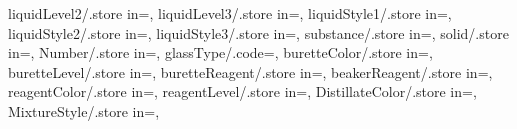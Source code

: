{  liquidLevel2/.store in=\tkzLiquidLevelII,
  liquidLevel3/.store in=\tkzLiquidLevelIII,
  liquidStyle1/.store in=\tkzLiquidStyleI,
  liquidStyle2/.store in=\tkzLiquidStyleII,
  liquidStyle3/.store in=\tkzLiquidStyleIII,
  substance/.store in=\tkzSubstance,
  solid/.store in=\tkzSolid,
  Number/.store in=\tkzNumber,
  glassType/.code={\edef\tkzGlassType{\tkzGlassTypeLookup{#1}}\def\tkzGlassTypeName{#1}},
  buretteColor/.store in=\tkzBuretteColor,
  buretteLevel/.store in=\tkzBuretteLevel,
  buretteReagent/.store in=\tkzBuretteReagent,
  beakerReagent/.store in=\tkzBeakerReagent,
  reagentColor/.store in=\tkzReagentColor,
  reagentLevel/.store in=\tkzReagentLevel,
  DistillateColor/.store in=\tkzDistillateColor,
  MixtureStyle/.store in=\tkzMixtureStyle,
}

\newcommand{\tikzchemlabdefaults}{%
  \TkzBurettetrue
  \TkzTitrationPHMeterfalse
  \TkzTestTubeStopperfalse
  \TkzTestTubeStraightTubefalse
  \TkzTestTubeElbowTubefalse
  \TkzTestTubeUTubefalse
  \TkzTestTubeUTubeLongfalse
  \TkzTestTubeCurvedTubefalse
  \TkzTestTubeCurvedTubeShortfalse
  \TkzTestTubeDoubleTubefalse
  \TkzTestTubeCondenserBulbsfalse
  \TkzTestTubeClampfalse
  \TkzBubblingfalse
  \TkzGasCollectionfalse
  \TkzTubeOnlyfalse
  \TkzGasTubeStraightfalse
  \TkzBunsenBurnertrue
  \TkzLabelfalse
  \TkzMagneticStirrertrue
  \TkzTapOpenfalse
  \def\tkzTiltAngle{0}%
  \def\tkzLiquidLevelI{50}%
  \def\tkzLiquidLevelII{0}%
  \def\tkzLiquidLevelIII{0}%
  \def\tkzLiquidStyleI{liquidStyle1}%
  \def\tkzLiquidStyleII{liquidStyle2}%
  \def\tkzLiquidStyleIII{liquidStyle3}%
  \def\tkzSubstance{}%
  \def\tkzSolid{}%
  \def\tkzNumber{}%
  \def\tkzGlassType{0}%
  \def\tkzGlassTypeName{tube}%
  \def\tkzBuretteColor{VeryPaleOrange}%
  \def\tkzBuretteLevel{20}%
  \def\tkzBuretteReagent{}%
  \def\tkzBeakerReagent{}%
  \def\tkzReagentColor{PaleOrange}%
  \def\tkzReagentLevel{2}%
  \def\tkzDistillateColor{yellow}%
  \def\tkzMixtureStyle{BlueDiffusion}%
}


\newcommand{\tkzBuretteBodyPath}{%
  (-0.5,11.5) -- (-0.25,11) -- (-0.25,3) -- (0,2.75) -- (0,0.5)
  -- (0.2,0.7) -- (0.2,2.75) -- (0.5,3) -- (0.5,11) -- (0.75,11.5) -- cycle
}

\newcommand{\tkzPipetteBodyPath}{%
  (-0.05,0) -- (-0.15,0.2) -- (-0.15,6)
  -- (0.15,6) -- (0.15,0.2) -- (0.05,0) -- cycle
  (0,0) .. controls (0.25,-.4) and (-.25,-.4) .. (0,0)
}

